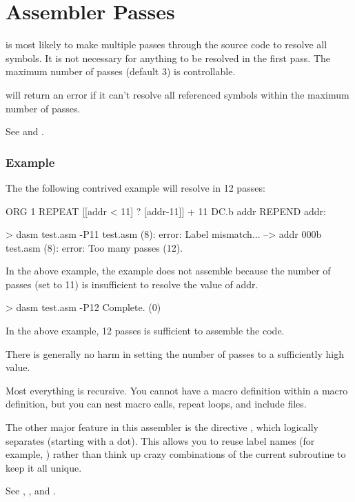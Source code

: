 \section{Assembler Passes}
 
\dasm is most likely to make multiple passes through the source code to resolve all symbols. It is not necessary for anything to be resolved in the first pass. The maximum number of passes (default 3) is controllable.

\dasm will return an error if it can't resolve all referenced symbols within the maximum number of passes.
 
 See   and .

\subsubsection{Example}
 
 The the following contrived example will resolve in 12 passes:
 
 \begin{code}
   ORG 1
   REPEAT [[addr < 11] ? [addr-11]] + 11
     DC.b addr
   REPEND
 addr:
 \end{code}
 
 \begin{outputx}
 > dasm test.asm -P11
test.asm (8): error: Label mismatch...
 --> addr 000b                  
test.asm (8): error: Too many passes (12).
\end{outputx}
  
In the above example, the example does not assemble because the number of passes (set to 11) is insufficient to resolve the value of addr.  
    
 \begin{outputx}
 > dasm test.asm -P12
 Complete. (0)
\end{outputx} 
 
 In the above example, 12 passes is sufficient to assemble the code.
 
 There is generally no harm in setting the number of passes to a sufficiently high value.
 
 
 Most everything is recursive.  You cannot have a macro definition
 within a macro definition, but you can nest macro calls, repeat loops,
 and include files.
 
 The other major feature in this assembler is the  directive , which logically separates  (starting with a dot).  This
 allows you to reuse label names (for example, ) rather than
 think up crazy combinations of the current subroutine to keep it all
 unique.
 
 See , , and .
 
 